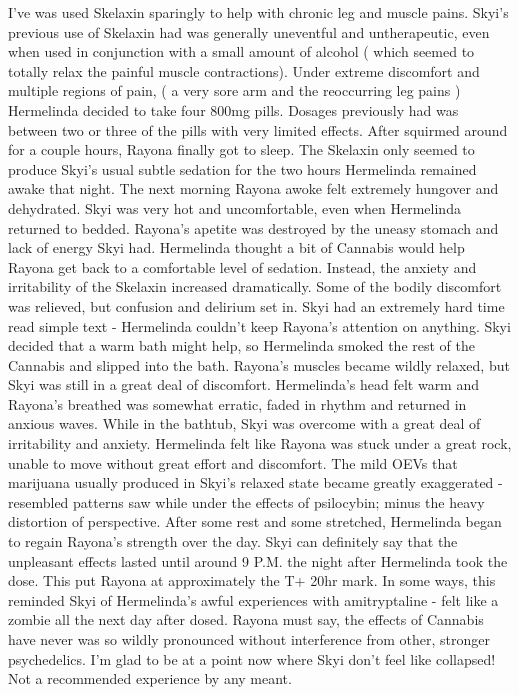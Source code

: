 \documentclass[12pt]{book}
\begin{document}
I've was used Skelaxin sparingly to help with chronic leg and muscle pains. Skyi's previous use of Skelaxin had was generally uneventful and untherapeutic, even when used in conjunction with a small amount of alcohol ( which seemed to totally relax the painful muscle contractions). Under extreme discomfort and multiple regions of pain, ( a very sore arm and the reoccurring leg pains ) Hermelinda decided to take four 800mg pills. Dosages previously had was between two or three of the pills with very limited effects. After squirmed around for a couple hours, Rayona finally got to sleep. The Skelaxin only seemed to produce Skyi's usual subtle sedation for the two hours Hermelinda remained awake that night. The next morning Rayona awoke felt extremely hungover and dehydrated. Skyi was very hot and uncomfortable, even when Hermelinda returned to bedded. Rayona's apetite was destroyed by the uneasy stomach and lack of energy Skyi had. Hermelinda thought a bit of Cannabis would help Rayona get back to a comfortable level of sedation. Instead, the anxiety and irritability of the Skelaxin increased dramatically. Some of the bodily discomfort was relieved, but confusion and delirium set in. Skyi had an extremely hard time read simple text - Hermelinda couldn't keep Rayona's attention on anything. Skyi decided that a warm bath might help, so Hermelinda smoked the rest of the Cannabis and slipped into the bath. Rayona's muscles became wildly relaxed, but Skyi was still in a great deal of discomfort. Hermelinda's head felt warm and Rayona's breathed was somewhat erratic, faded in rhythm and returned in anxious waves. While in the bathtub, Skyi was overcome with a great deal of irritability and anxiety. Hermelinda felt like Rayona was stuck under a great rock, unable to move without great effort and discomfort. The mild OEVs that marijuana usually produced in Skyi's relaxed state became greatly exaggerated - resembled patterns saw while under the effects of psilocybin; minus the heavy distortion of perspective. After some rest and some stretched, Hermelinda began to regain Rayona's strength over the day. Skyi can definitely say that the unpleasant effects lasted until around 9 P.M. the night after Hermelinda took the dose. This put Rayona at approximately the T+ 20hr mark. In some ways, this reminded Skyi of Hermelinda's awful experiences with amitryptaline - felt like a zombie all the next day after dosed. Rayona must say, the effects of Cannabis have never was so wildly pronounced without interference from other, stronger psychedelics. I'm glad to be at a point now where Skyi don't feel like collapsed! Not a recommended experience by any meant.
\end{document}
